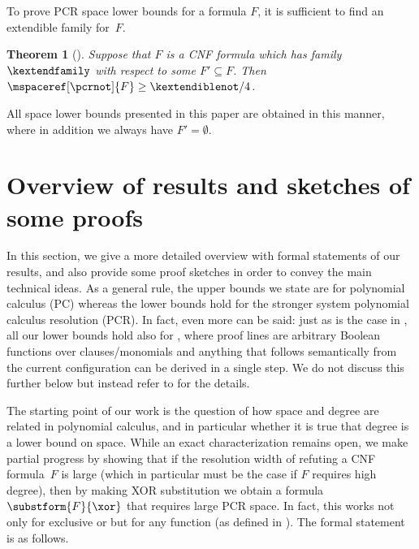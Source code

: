 \documentclass[11pt]{article}
\numberwithin{equation}{section}
\newtheorem{theorem}{Theorem}[section]
\theoremstyle{definition}
\theoremstyle{plain}
\begin{document}
To prove PCR space lower bounds for a formula $F$, it is sufficient to
find an extendible family for~$F$.

\begin{theorem}[\cite{BG15Framework}]
  \label{th:space-lower-bound}
Suppose that $F$ is a CNF formula which has \akextendible
  family~$\kextendfamily$
  with respect to some $F'\subseteq F$. Then
  $\mspaceref[\pcrnot]{F}\geq \kextendiblenot/4$.
\end{theorem}

All space lower bounds presented in this paper are obtained in this
  manner, where in addition we always have
  $F' = \emptyset$.
 
%
\section{Overview of results and sketches of some proofs}
\label{sec:overview-results}

In this section, we give
%
a more detailed overview with formal statements of our
results, and also provide some proof sketches in order to convey the
main technical ideas.
As a general rule, the upper bounds we state are for polynomial
  calculus (PC) whereas the lower bounds hold for the stronger system
  polynomial calculus resolution (PCR).
  In fact, even more can be said: just as is the case in
  \cite{ABRW02SpaceComplexity,FLNRT15SpaceCplx,BG15Framework},
  all our lower bounds
  hold also for
  ,
  where proof lines are arbitrary Boolean functions over
  clauses/monomials and anything that follows semantically from the
  current configuration can be derived in a single step. We do not
  discuss this further below but instead refer to
  for the details.


\label{sec:width-monomialspace}

The starting point of our work is the question of how space and degree
are related in polynomial calculus, and in particular whether it is
true that degree %
%
%
is a lower bound on space.  %
%
%
While an exact characterization remains
open, we make partial progress by showing that if the resolution width
of refuting a CNF formula~$F$ is large (which in particular must be
the case if $F$ requires high degree), then by making XOR
substitution we obtain a formula
$\substform{F}{\xor}$
that requires
large PCR space.
In fact, this works not only for exclusive or but for any
\nonauthor function
(as defined in ).
The formal statement
%
is as follows.
\end{document}

